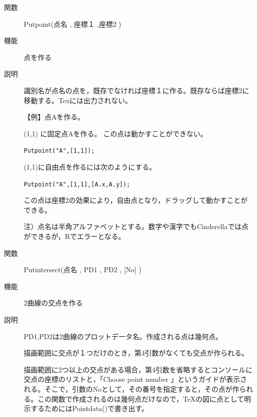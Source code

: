 \documentclass[papersize,a4paper,10pt,uplatex]{jsarticle}
\begin{document}
\begin{description}





\vspace{\baselineskip}
\hypertarget{putpoint}{}
\item[関数]Putpoint(点名 , 座標１ ,座標2 )
\item[機能]点を作る
\item[説明]識別名が点名の点を，既存でなければ座標１に作る。既存ならば座標2に移動する。Texには出力されない。

\vspace{\baselineskip}
【例】点Aを作る。

(1,1) に固定点Aを作る。 この点は動かすことができない。

\hspace{10mm} \verb|Putpoint("A",[1,1]);|
 
(1,1)に自由点を作るには次のようにする。

\hspace{10mm}\verb|Putpoint("A",[1,1],[A.x,A.y]);|
 
この点は座標2の効果により，自由点となり，ドラッグして動かすことができる。

\vspace{\baselineskip}
注）点名は半角アルファベットとする。数字や漢字でもCinderellaでは点ができるが，Rでエラーとなる。

\vspace{\baselineskip}
\hypertarget{putintersect}{}
\item[関数]Putintersect(点名 , PD1 , PD2 , [No] )
\item[機能]2曲線の交点を作る
\item[説明]PD1,PD2は2曲線のプロットデータ名。作成される点は幾何点。

描画範囲に交点が１つだけのとき，第4引数がなくても交点が作られる。

描画範囲に2つ以上の交点がある場合，第4引数を省略するとコンソールに交点の座標のリストと，「Choose point number 」というガイドが表示される。そこで，引数のNoとして，その番号を指定すると，その点が作られる。この関数で作成されるのは幾何点だけなので，\TeX の図に点として明示するためにはPointdata()で書き出す。


\end{description}
\end{document}
